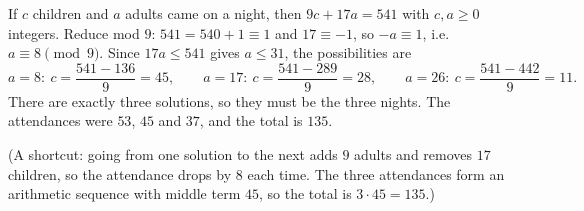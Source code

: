 If $c$ children and $a$ adults came on a night, then $9c+17a=541$ with $c,a\ge0$ integers. Reduce mod $9$: $541=540+1\equiv1$ and $17\equiv-1$, so $-a\equiv1$, i.e. $a\equiv8\pmod9$. Since $17a\le541$ gives $a\le31$, the possibilities are
\[a=8:\ c=\dfrac{541-136}{9}=45,\qquad a=17:\ c=\dfrac{541-289}{9}=28,\qquad a=26:\ c=\dfrac{541-442}{9}=11.\]
There are exactly three solutions, so they must be the three nights. The attendances were $53$, $45$ and $37$, and the total is $\boxed{135}$.

(A shortcut: going from one solution to the next adds $9$ adults and removes $17$ children, so the attendance drops by $8$ each time. The three attendances form an arithmetic sequence with middle term $45$, so the total is $3\cdot45=135$.)

